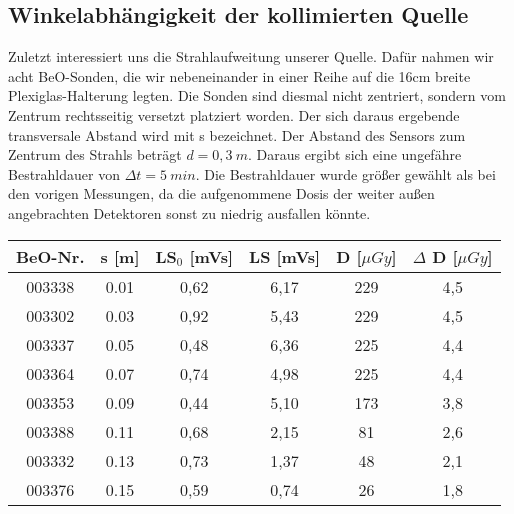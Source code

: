 \subsection{Winkelabhängigkeit der kollimierten Quelle}

Zuletzt interessiert uns die Strahlaufweitung unserer Quelle. Dafür nahmen wir acht BeO-Sonden, die wir nebeneinander in einer Reihe auf die 16cm breite Plexiglas-Halterung legten. Die Sonden sind diesmal nicht zentriert, sondern vom Zentrum rechtsseitig versetzt platziert worden. Der sich daraus ergebende transversale Abstand wird mit s bezeichnet. Der Abstand des Sensors zum Zentrum des Strahls beträgt $d = 0,3\ \unit{m}$. Daraus ergibt sich eine ungefähre Bestrahldauer von $\Delta t = 5\ \unit{min}$. Die Bestrahldauer wurde größer gewählt als bei den vorigen Messungen, da die aufgenommene Dosis der weiter außen angebrachten Detektoren sonst zu niedrig ausfallen könnte.

\vspace{5mm}
\minipanf
	\begin{center}
		\begin{tabular}{c|c|c|c|c|c}
				\textbf{BeO-Nr.}& \textbf{s} [m] & \textbf{LS$_0$} [mVs] & \textbf{LS} [mVs] & \textbf{D} [$\mu Gy$] & $\Delta$ \textbf{D} [$\mu Gy$] \\
		 \hline 003338 &  0.01 & 0,62 & 6,17 & 229 & 4,5 \\
				003302 &  0.03 & 0,92 & 5,43 & 229 & 4,5 \\
				003337 &  0.05 & 0,48 & 6,36 & 225 & 4,4 \\
				003364 &  0.07 & 0,74 & 4,98 & 225 & 4,4 \\
				003353 &  0.09 & 0,44 & 5,10 & 173 & 3,8 \\
				003388 & 0.11	& 0,68 & 2,15 & 81 & 2,6 \\
				003332 & 0.13 & 0,73 & 1,37 & 48 & 2,1 \\
				003376 & 0.15 & 0,59 & 0,74 & 26 & 1,8 \\
		\end{tabular}
        \label{dft:Aufweitung}
	\end{center} 
\minipend
\vspace{5mm}
